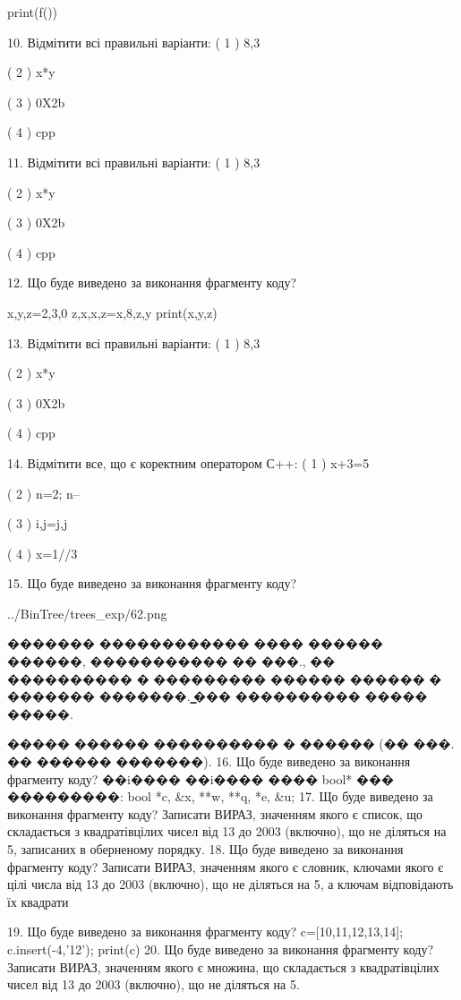 \documentclass[11pt]{article}
\begin{document}
print(f())

10. Відмітити всі правильні варіанти:
( 1 ) 8,3

( 2 ) x*y

( 3 ) 0X2b

( 4 ) cpp

11. Відмітити всі правильні варіанти:
( 1 ) 8,3

( 2 ) x*y

( 3 ) 0X2b

( 4 ) cpp

12. Що буде виведено за виконання фрагменту коду?

x,y,z=2,3,0
z,x,x,z=x,8,z,y
print(x,y,z)

13. Відмітити всі правильні варіанти:
( 1 ) 8,3

( 2 ) x*y

( 3 ) 0X2b

( 4 ) cpp

14. Відмітити все, що є коректним оператором С++:
( 1 ) x+3=5

( 2 ) n=2; n--

( 3 ) i,j=j,j

( 4 ) x=1//3

15. Що буде виведено за виконання фрагменту коду?

\begin{center}
	{../BinTree/trees_exp/62.png}
\end{center}
������� ������������ ���� ������ ������, ����������� �� ���., �� ���������� � ��������� ������ ������ � ������� �������. ̳��� ���������� ����� �����.\par ����� ������ ���������� � ������ (�� ���. �� ������ �������).
16. Що буде виведено за виконання фрагменту коду?
��i���� ��i���� ���� bool* ��� ���������: bool *c, &x, **w, **q, *e, &u;
17. Що буде виведено за виконання фрагменту коду?
Записати ВИРАЗ, значенням якого є список, що складається з квадратівцілих чисел від 13 до 2003 (включно), що не діляться на 5, записаних в оберненому порядку.
18. Що буде виведено за виконання фрагменту коду?
Записати ВИРАЗ, значенням якого є словник, ключами якого є цілі числа від 13 до 2003 (включно), що не діляться на 5, а ключам відповідають їх квадрати 

19. Що буде виведено за виконання фрагменту коду?
c=[10,11,12,13,14]; c.insert(-4,'12'); print(c)
20. Що буде виведено за виконання фрагменту коду?
Записати ВИРАЗ, значенням якого є множина, що складається з квадратівцілих чисел від 13 до 2003 (включно), що не діляться на 5.
\end{document}
